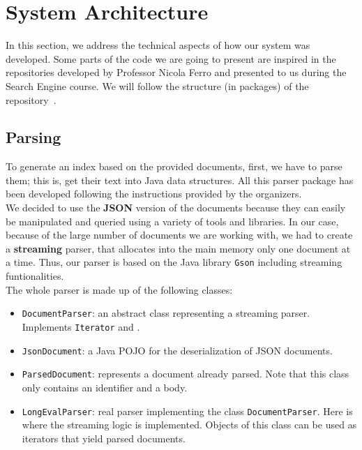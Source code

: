 \section{System Architecture}\label{sec:architecture}

In this section, we address the technical aspects of how our system was developed.
Some parts of the code we are going to present are inspired in the repositories developed by Professor Nicola Ferro and
presented to us during the Search Engine course.
We will follow the structure (in packages) of the repository~\cite{jihuming}.

\subsection{Parsing}\label{subsec:parsing}

To generate an index based on the provided documents, first, we have to parse them;
this is, get their text into Java data structures.
All this parser package has been developed following the instructions provided by the organizers.\\

We decided to use the \textbf{JSON} version of the documents because they can easily be manipulated and queried using a
variety of tools and libraries.
In our case, because of the large number of documents we are working with, we had to create a \textbf{streaming} parser,
that allocates into the main memory only one document at a time.
Thus, our parser is based on the Java library \texttt{Gson} including streaming funtionalities.\\

The whole parser is made up of the following classes:
\begin{itemize}
    \item \texttt{DocumentParser}: an abstract class representing a streaming parser.
    Implements \texttt{Iterator} and .
    \item \texttt{JsonDocument}: a Java POJO for the deserialization of JSON documents.
    \item \texttt{ParsedDocument}: represents a document already parsed.
    Note that this class only contains an identifier and a body.
    \item \texttt{LongEvalParser}: real parser implementing the class \texttt{DocumentParser}.
    Here is where the streaming logic is implemented.
    Objects of this class can be used as iterators that yield parsed documents.
\end{itemize}

